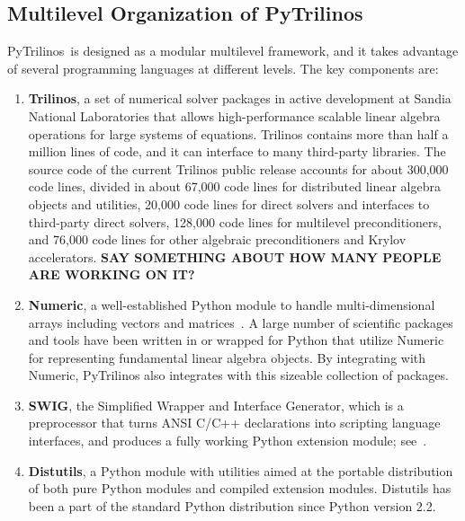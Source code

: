 \documentclass[acmtocl]{acmtrans2m}
\newcommand{\PyTrilinos}{{PyTrilinos}}
\begin{document}
\subsection{Multilevel Organization of PyTrilinos}
\label{sec:multilevel}

\PyTrilinos\ is designed as a modular multilevel framework, and it
takes advantage of several programming languages at different levels.
The key components are:

\begin{enumerate}

\item {\bf Trilinos}, a set of numerical solver packages in active
  development at Sandia National Laboratories that allows
  high-performance scalable linear algebra operations for large
  systems of equations. Trilinos contains more than half a million
  lines of code, and it can interface to many third-party
  libraries. The source code of the current Trilinos public release
  accounts for about 300,000 code lines, divided in about 67,000 code
  lines for distributed linear algebra objects and utilities, 20,000
  code lines for direct solvers and interfaces to third-party direct
  solvers, 128,000 code lines for multilevel preconditioners, and
  76,000 code lines for other algebraic preconditioners and Krylov
  accelerators. {\bf SAY SOMETHING ABOUT HOW MANY PEOPLE ARE WORKING ON IT?}

\item {\bf Numeric}, a well-established Python module to handle
  multi-dimensional arrays including vectors and
  matrices~\cite{numeric}.  A large number of scientific packages and
  tools have been written in or wrapped for Python that utilize
  Numeric for representing fundamental linear algebra objects.  By
  integrating with Numeric, PyTrilinos also integrates with this
  sizeable collection of packages.

\item {\bf SWIG}, the Simplified Wrapper and Interface Generator,
  which is a preprocessor that turns ANSI C/C++ declarations into
  scripting language interfaces, and produces a fully working Python
  extension module; see~\cite{swig}.

\item {\bf Distutils}, a Python module with utilities aimed at the
  portable distribution of both pure Python modules and compiled
  extension modules.  Distutils has been a part of the standard Python
  distribution since Python version 2.2.

\end{enumerate}
\end{document}
